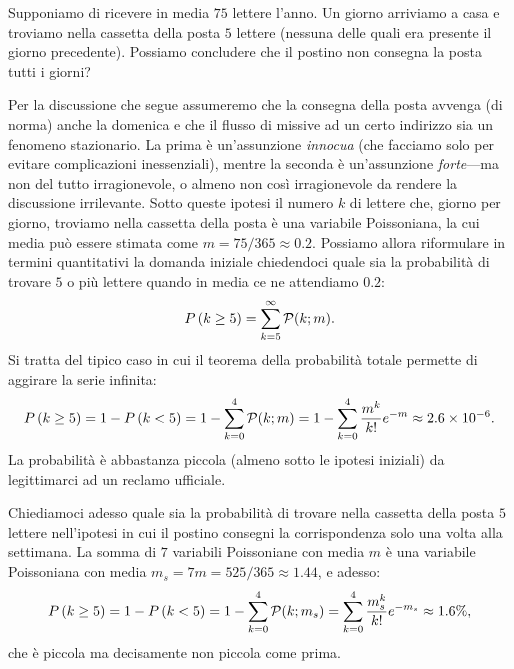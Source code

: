 \begin{examplebox}
  \begin{example}%
    \label{example:postino_poisson}
    Supponiamo di ricevere in media $75$ lettere l'anno. Un giorno arriviamo
    a casa e troviamo nella cassetta della posta $5$ lettere (nessuna delle
    quali era presente il giorno precedente). Possiamo concludere che il
    postino non consegna la posta tutti i giorni?

    Per la discussione che segue assumeremo che la consegna della posta avvenga
    (di norma) anche la domenica e che il flusso di missive ad un certo
    indirizzo sia un fenomeno stazionario. La prima è un'assunzione
    \emph{innocua} (che facciamo solo per evitare complicazioni inessenziali),
    mentre la seconda è un'assunzione \emph{forte}---ma non del tutto
    irragionevole, o almeno non così irragionevole da rendere la
    discussione irrilevante.
    Sotto queste ipotesi il numero $k$ di lettere che, giorno per giorno,
    troviamo nella cassetta della posta è una variabile Poissoniana, la cui
    media può essere stimata come $m = 75/365 \approx 0.2$. Possiamo allora
    riformulare in termini quantitativi la domanda iniziale chiedendoci
    quale sia  la probabilità di trovare $5$ o più lettere quando in media
    ce ne attendiamo $0.2$:
    \begin{align*}
      \prob{k \geq 5} = \sum_{k=5}^{\infty} \poissonpdf[m]{k}.
    \end{align*}
    Si tratta del tipico caso in cui il teorema della probabilità totale
    permette di aggirare la serie infinita:
    \begin{align*}
      \prob{k \geq 5} = 1 - \prob{k < 5} = 1 - \sum_{k=0}^{4} \poissonpdf[m]{k} =
      1 - \sum_{k=0}^{4} \frac{m^k}{k!}e^{-m} \approx 2.6 \times 10^{-6}.
    \end{align*}
    La probabilità è abbastanza piccola (almeno sotto le ipotesi iniziali)
    da legittimarci ad un reclamo ufficiale.

    Chiediamoci adesso quale sia la probabilità di trovare nella cassetta
    della posta $5$ lettere nell'ipotesi in cui il postino consegni la
    corrispondenza solo una volta alla settimana.
    La somma di $7$ variabili Poissoniane con media $m$ è una variabile
    Poissoniana con media $m_s = 7m = 525/365 \approx 1.44$, e adesso:
    \begin{align*}
      \prob{k \geq 5} = 1 - \prob{k < 5} =
      1 - \sum_{k=0}^{4} \poissonpdf[m_s]{k} =
      \sum_{k=0}^{4} \frac{m_s^k}{k!}e^{-m_s} \approx 1.6\%,
    \end{align*}
    che è piccola ma decisamente non piccola come prima.
  \end{example}
\end{examplebox}



